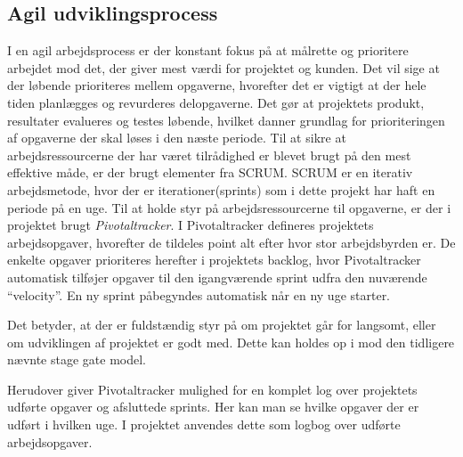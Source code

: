


\subsection{Agil udviklingsprocess}
I en agil arbejdsprocess er der konstant fokus på at målrette og prioritere arbejdet mod det, der giver mest værdi for projektet og kunden. Det vil sige at der løbende prioriteres mellem opgaverne, hvorefter det er vigtigt at der hele tiden planlægges og revurderes delopgaverne. Det gør at projektets produkt, resultater evalueres og testes løbende, hvilket danner grundlag for prioriteringen af opgaverne der skal løses i den næste periode. Til at sikre at arbejdsressourcerne der har været tilrådighed er blevet brugt på den mest effektive måde, er der brugt elementer fra SCRUM. SCRUM er en iterativ arbejdsmetode, hvor  der er iterationer(sprints) som i dette projekt har haft en periode på en uge. Til at holde styr på arbejdsressourcerne til opgaverne, er der i projektet brugt \textit{Pivotaltracker}. 
I Pivotaltracker defineres projektets arbejdsopgaver, hvorefter de tildeles point alt efter hvor stor arbejdsbyrden er. De enkelte opgaver prioriteres herefter i projektets backlog, hvor Pivotaltracker automatisk tilføjer opgaver til den igangværende sprint udfra den nuværende “velocity”. En ny sprint påbegyndes automatisk når en ny uge starter.

Det betyder, at der er fuldstændig styr på om projektet går for langsomt, eller om udviklingen af projektet er godt med. Dette kan holdes op i mod den tidligere nævnte stage gate model.

Herudover giver Pivotaltracker mulighed for en komplet log over projektets udførte opgaver og afsluttede sprints. Her kan man se hvilke opgaver der er udført i hvilken uge. I projektet anvendes dette som logbog over udførte arbejdsopgaver.

